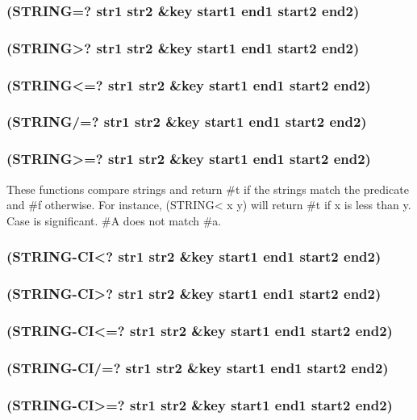 \documentclass[11pt]{article}
\begin{document}
\subsubsection{(STRING=? str1 str2 \&key start1 end1 start2 end2)}
\label{sec-4-29-2}
\subsubsection{(STRING>? str1 str2 \&key start1 end1 start2 end2)}
\label{sec-4-29-3}
\subsubsection{(STRING<=? str1 str2 \&key start1 end1 start2 end2)}
\label{sec-4-29-4}
\subsubsection{(STRING/=? str1 str2 \&key start1 end1 start2 end2)}
\label{sec-4-29-5}
\subsubsection{(STRING>=? str1 str2 \&key start1 end1 start2 end2)}
\label{sec-4-29-6}

These functions compare strings and return \#t if the strings match
the predicate and \#f otherwise.  For instance, (STRING< x y) will
return \#t if x is less than y.  Case is significant.  \#A does not
match \#a.
\subsubsection{(STRING-CI<? str1 str2 \&key start1 end1 start2 end2)}
\label{sec-4-29-7}
\subsubsection{(STRING-CI>? str1 str2 \&key start1 end1 start2 end2)}
\label{sec-4-29-8}
\subsubsection{(STRING-CI<=? str1 str2 \&key start1 end1 start2 end2)}
\label{sec-4-29-9}
\subsubsection{(STRING-CI/=? str1 str2 \&key start1 end1 start2 end2)}
\label{sec-4-29-10}
\subsubsection{(STRING-CI>=? str1 str2 \&key start1 end1 start2 end2)}
\label{sec-4-29-11}
\end{document}
